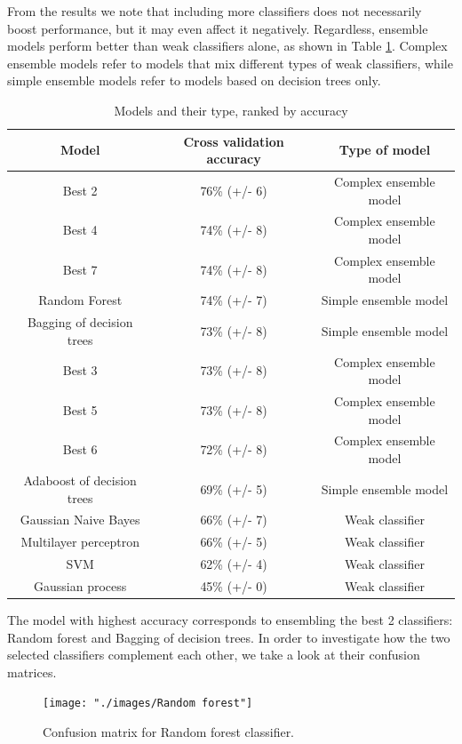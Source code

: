 \documentclass{article}
\begin{document}
From the results we note that including more classifiers does not necessarily boost performance, but it may even affect it negatively. Regardless, ensemble models perform better than weak classifiers alone, as shown in Table \ref{table:rankingModels}. Complex ensemble models refer to models that mix different types of weak classifiers, while simple ensemble models refer to models based on decision trees only. 

\begin{table}[H]
\centering
\begin{tabular}{||c|c|c||}
\hline
\textbf{Model} & \textbf{Cross validation accuracy} & \textbf{Type of model} \\ [0.5ex] 
\hline \hline
Best 2 & 76\% (+/- 6) & Complex ensemble model \\
Best 4 & 74\% (+/- 8) & Complex ensemble model \\
Best 7 & 74\% (+/- 8) & Complex ensemble model  \\
Random Forest & 74\% (+/- 7) & Simple ensemble model \\
Bagging of decision trees & 73\% (+/- 8) & Simple ensemble model \\ 
Best 3 & 73\% (+/- 8) & Complex ensemble model \\
Best 5 & 73\% (+/- 8) & Complex ensemble model \\
Best 6 & 72\% (+/- 8) & Complex ensemble model \\
Adaboost of decision trees & 69\% (+/- 5) & Simple ensemble model \\
Gaussian Naive Bayes &66\% (+/- 7) & Weak classifier \\
Multilayer perceptron & 66\% (+/- 5) & Weak classifier \\
SVM & 62\% (+/- 4) & Weak classifier \\
Gaussian process & 45\% (+/- 0) & Weak classifier \\[1ex]
\hline 
\end{tabular}
\caption{Models and their type, ranked by accuracy}
\label{table:rankingModels}
\end{table}

The model with highest accuracy corresponds to ensembling the best 2 classifiers: Random forest and Bagging of decision trees. In order to investigate how the two selected classifiers complement each other, we take a look at their confusion matrices. 

\begin{figure}[H]
  \centering
  \texttt{[image: "./images/Random forest"]}
  \caption{Confusion matrix for Random forest classifier.}
  \label{fig:classification/rf_confusion}
\end{figure}
\end{document}
